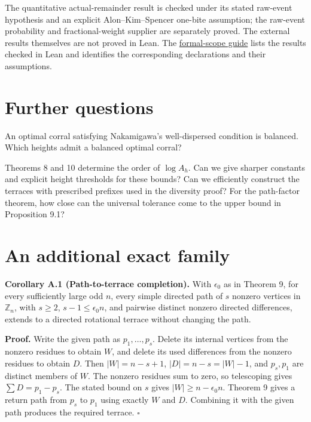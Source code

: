 \documentclass[11pt,a4paper]{article}
\newcommand{\statementstart}{\par\addvspace{6pt plus 1pt minus 1pt}\noindent}
\newcommand{\labelledparagraphstart}{\par\addvspace{3pt plus 1pt minus 1pt}\noindent}
\begin{document}
The quantitative actual-remainder result is checked under its stated raw-event hypothesis and an explicit Alon--Kim--Spencer one-bite assumption; the raw-event probability and fractional-weight supplier are separately proved. The external results themselves are not proved in Lean. The \href{FORMAL-SCOPE.md}{formal-scope guide} lists the results checked in Lean and identifies the corresponding declarations and their assumptions.

\hypertarget{further-questions}{%
\section{Further questions}\label{further-questions}}

An optimal corral satisfying Nakamigawa's well-dispersed condition \cite{Nak15} is balanced. Which heights admit a balanced optimal corral?

Theorems 8 and 10 determine the order of \(\log A_h\). Can we give sharper constants and explicit height thresholds for these bounds? Can we efficiently construct the terraces with prescribed prefixes used in the diversity proof? For the path-factor theorem, how close can the universal tolerance come to the upper bound in Proposition 9.1?

\appendix

\hypertarget{an-additional-exact-family}{%
\section{An additional exact family}\label{an-additional-exact-family}}

\statementstart\textbf{Corollary A.1 (Path-to-terrace completion).} With \(\epsilon_0\) as in Theorem 9, for every sufficiently large odd \(n\), every simple directed path of \(s\) nonzero vertices in \(\mathbb Z_n\), with \(s\geq2\), \(s-1\leq\epsilon_0n\), and pairwise distinct nonzero directed differences, extends to a directed rotational terrace without changing the path.

\labelledparagraphstart\textbf{Proof.} Write the given path as \(p_1,\ldots,p_s\). Delete its internal vertices from the nonzero residues to obtain \(W\), and delete its used differences from the nonzero residues to obtain \(D\). Then \(|W|=n-s+1\), \(|D|=n-s=|W|-1\), and \(p_s,p_1\) are distinct members of \(W\). The nonzero residues sum to zero, so telescoping gives \(\sum D=p_1-p_s\). The stated bound on \(s\) gives \(|W|\geq n-\epsilon_0n\). Theorem 9 gives a return path from \(p_s\) to \(p_1\) using exactly \(W\) and \(D\). Combining it with the given path produces the required terrace. \(\square\)
\end{document}
